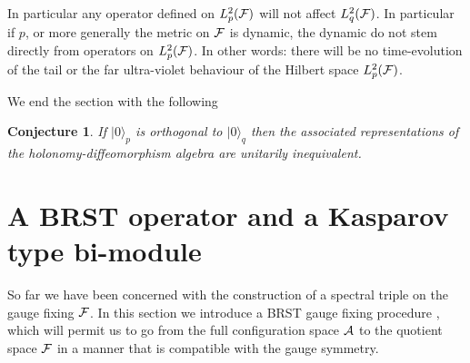 \documentclass[letterpaper,12pt]{article}
\def\ca{{\cal A}}
\def\cf{{\cal F}}
\newtheorem{conj}[thm]{Conjecture}
\begin{document}
In particular any operator defined on $L^2_p(\cf )$ will not affect $L^2_q(\cf )$. In particular if $p$, or more generally the metric on $\cf$ is dynamic, the dynamic do not stem directly from operators on $L^2_p(\cf )$. In other words: there will be no time-evolution of the tail or the far ultra-violet behaviour of the Hilbert space $L^2_p(\cf )$.


We end the section with the following
\begin{conj}
If $|0\rangle_p$ is orthogonal to $|0\rangle_q$ then the associated representations of the holonomy-diffeomorphism algebra are unitarily inequivalent.
\end{conj}






\section{A BRST operator and a Kasparov type bi-module}
\label{BRST} 

So far we have been concerned with the construction of a spectral triple on the gauge fixing $\cf$. 
In this section we introduce a BRST gauge fixing procedure \cite{Becchi:1975nq,Tyutin:1975qk,Barnich:2000zw,Henneaux:1992ig}, which will permit us to go from the full configuration space $\ca$ to the quotient space $\cf$ in a manner that is compatible with the gauge symmetry.\\
\end{document}
